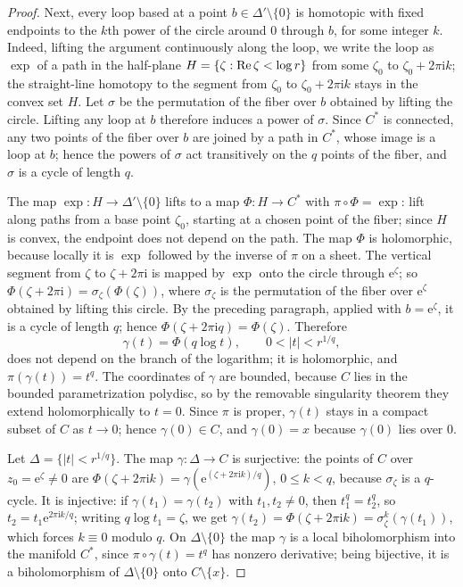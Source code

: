 \begin{proof}
Next, every loop based at a point $b\in\Delta'\setminus\{0\}$ is homotopic with fixed endpoints to the $k$th power of the circle around $0$ through $b$, for some integer $k$. Indeed, lifting the argument continuously along the loop, we write the loop as $\exp$ of a path in the half-plane $H=\{\zeta:\operatorname{Re}\zeta<\log r\}$ from some $\zeta_0$ to $\zeta_0+2\pi\mathrm ik$; the straight-line homotopy to the segment from $\zeta_0$ to $\zeta_0+2\pi\mathrm ik$ stays in the convex set $H$. Let $\sigma$ be the permutation of the fiber over $b$ obtained by lifting the circle. Lifting any loop at $b$ therefore induces a power of $\sigma$. Since $C^*$ is connected, any two points of the fiber over $b$ are joined by a path in $C^*$, whose image is a loop at $b$; hence the powers of $\sigma$ act transitively on the $q$ points of the fiber, and $\sigma$ is a cycle of length $q$.

The map $\exp\colon H\to\Delta'\setminus\{0\}$ lifts to a map $\Phi\colon H\to C^*$ with $\pi\circ\Phi=\exp$: lift along paths from a base point $\zeta_0$, starting at a chosen point of the fiber; since $H$ is convex, the endpoint does not depend on the path. The map $\Phi$ is holomorphic, because locally it is $\exp$ followed by the inverse of $\pi$ on a sheet. The vertical segment from $\zeta$ to $\zeta+2\pi\mathrm i$ is mapped by $\exp$ onto the circle through $\mathrm e^\zeta$; so $\Phi(\zeta+2\pi\mathrm i)=\sigma_\zeta(\Phi(\zeta))$, where $\sigma_\zeta$ is the permutation of the fiber over $\mathrm e^\zeta$ obtained by lifting this circle. By the preceding paragraph, applied with $b=\mathrm e^\zeta$, it is a cycle of length $q$; hence $\Phi(\zeta+2\pi\mathrm iq)=\Phi(\zeta)$. Therefore
\[
 \gamma(t)=\Phi(q\log t),\qquad 0<|t|<r^{1/q},
\]
does not depend on the branch of the logarithm; it is holomorphic, and $\pi(\gamma(t))=t^q$. The coordinates of $\gamma$ are bounded, because $C$ lies in the bounded parametrization polydisc, so by the removable singularity theorem they extend holomorphically to $t=0$. Since $\pi$ is proper, $\gamma(t)$ stays in a compact subset of $C$ as $t\to0$; hence $\gamma(0)\in C$, and $\gamma(0)=x$ because $\gamma(0)$ lies over $0$.

Let $\Delta=\{|t|<r^{1/q}\}$. The map $\gamma\colon\Delta\to C$ is surjective: the points of $C$ over $z_0=\mathrm e^{\zeta}\neq0$ are $\Phi(\zeta+2\pi\mathrm ik)=\gamma(\mathrm e^{(\zeta+2\pi\mathrm ik)/q})$, $0\leq k<q$, because $\sigma_\zeta$ is a $q$-cycle. It is injective: if $\gamma(t_1)=\gamma(t_2)$ with $t_1,t_2\neq0$, then $t_1^q=t_2^q$, so $t_2=t_1\mathrm e^{2\pi\mathrm ik/q}$; writing $q\log t_1=\zeta$, we get $\gamma(t_2)=\Phi(\zeta+2\pi\mathrm ik)=\sigma_\zeta^k(\gamma(t_1))$, which forces $k\equiv0$ modulo $q$. On $\Delta\setminus\{0\}$ the map $\gamma$ is a local biholomorphism into the manifold $C^*$, since $\pi\circ\gamma(t)=t^q$ has nonzero derivative; being bijective, it is a biholomorphism of $\Delta\setminus\{0\}$ onto $C\setminus\{x\}$.


\end{proof}
